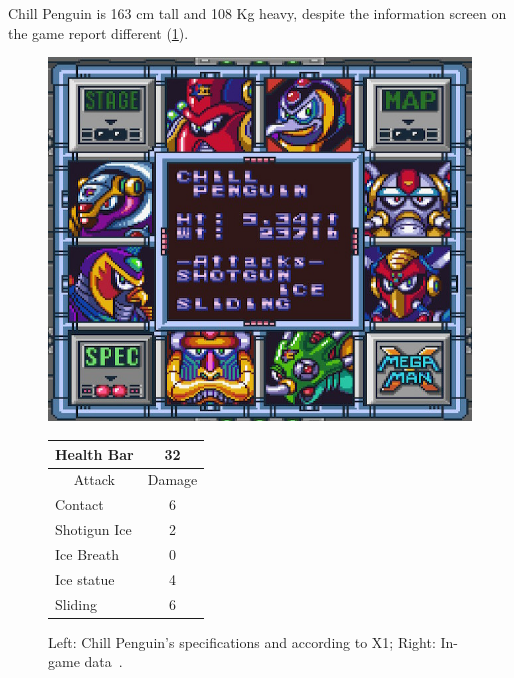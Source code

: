 Chill Penguin is 163 cm tall and 108 Kg heavy, despite the information screen on the game report different (\ref{Penguin_specs}).

\begin{figure}[htp]
	\begin{minipage}[c]{0.45\linewidth}
		\vspace{0pt}
		\centering
	\includegraphics[width=\linewidth]{figures/X1/Chill_penguin/Chill_penguin_specs.jpg}
	\end{minipage}
	\begin{minipage}[c]{0.45\linewidth}
		\centering
		\vspace{0pt}
		\begin{tabular}[h]{l c}
			\toprule
			Health Bar & 32\\
			\midrule
			\multicolumn{1}{c}{Attack} & \multicolumn{1}{c}{Damage}\\
			Contact & 6\\
			Shotigun Ice & 2\\
			Ice Breath & 0\\
			Ice statue & 4\\
			Sliding & 6\\
			\bottomrule
		\end{tabular}
	\end{minipage}
	\caption{Left: Chill Penguin's specifications and according to X1; Right: In-game data~\cite{wiki:Chill_Penguin}. }
	\label{Penguin_specs}
\end{figure}


